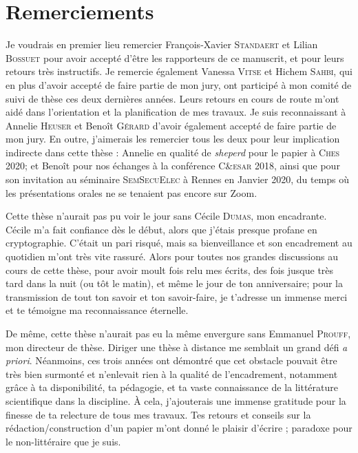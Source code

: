 \chapter*{Remerciements}

Je voudrais en premier lieu remercier François-Xavier \textsc{Standaert} et Lilian \textsc{Bossuet} pour avoir accepté d'être les rapporteurs de ce manuscrit, et pour leurs retours très instructifs. 
Je remercie également Vanessa \textsc{Vitse} et Hichem \textsc{Sahbi}, qui en plus d'avoir accepté de faire partie de mon jury, ont participé à mon comité de suivi de thèse ces deux dernières années. 
Leurs retours en cours de route m'ont aidé dans l'orientation et la planification de mes travaux.
Je suis reconnaissant à Annelie \textsc{Heuser} et Benoît \textsc{Gérard} d'avoir également accepté de faire partie de mon jury. 
En outre, j'aimerais les remercier tous les deux pour leur implication indirecte dans cette thèse : Annelie en qualité de \emph{sheperd} pour le papier à \textsc{Ches} 2020; et Benoît pour nos échanges à la conférence \textsc{C\&esar} 2018, ainsi que pour son invitation au séminaire \textsc{SemSecuElec} à Rennes en Janvier 2020, du temps où les présentations orales ne se tenaient pas encore sur Zoom.

Cette thèse n'aurait pas pu voir le jour sans Cécile \textsc{Dumas}, mon encadrante.
Cécile m'a fait confiance dès le début, alors que j'étais presque profane en cryptographie.
C'était un pari risqué, mais sa bienveillance et son encadrement au quotidien m'ont très vite rassuré.
Alors pour toutes nos grandes discussions au cours de cette thèse, pour avoir moult fois relu mes écrits, des fois jusque très tard dans la nuit (ou tôt le matin), et même le jour de ton anniversaire; pour la transmission de tout ton savoir et ton savoir-faire, je t'adresse un immense merci et te témoigne ma reconnaissance éternelle.

De même, cette thèse n'aurait pas eu la même envergure sans Emmanuel \textsc{Prouff}, mon directeur de thèse.
Diriger une thèse à distance me semblait un grand défi \textit{a priori}.
Néanmoins, ces trois années ont démontré que cet obstacle pouvait être très bien surmonté et n'enlevait rien à la qualité de l'encadrement, notamment grâce à ta disponibilité, ta pédagogie, et ta vaste connaissance de la littérature scientifique dans la discipline.
À cela, j'ajouterais une immense gratitude pour la finesse de ta relecture de tous mes travaux.
Tes retours et conseils sur la rédaction/construction d'un papier m'ont donné le plaisir d'écrire ; paradoxe pour le non-littéraire que je suis.

